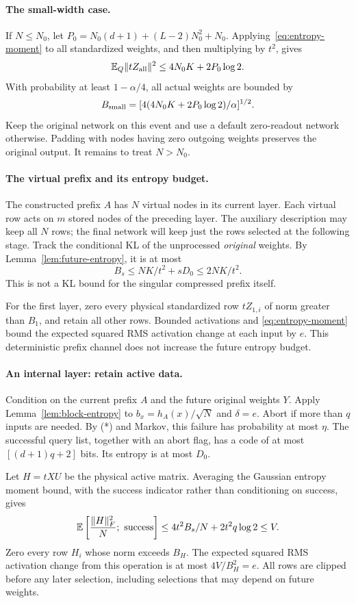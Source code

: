 \paragraph{The small-width case.}
If $N\le N_0$, let
$P_0=N_0(d+1)+(L-2)N_0^2+N_0$. Applying~\eqref{eq:entropy-moment} to all
standardized weights, and then multiplying by $t^2$, gives
\[
 \mathbb E_Q\|tZ_{\rm all}\|^2\le4N_0K+2P_0\log2.
\]
With probability at least $1-\alpha/4$, all actual weights are bounded by
\[
 B_{\rm small}=[4(4N_0K+2P_0\log2)/\alpha]^{1/2}.
\]
Keep the original network on this event and use a default zero-readout network otherwise.
Padding with nodes having zero outgoing weights preserves the original output.
It remains to treat $N>N_0$.

\paragraph{The virtual prefix and its entropy budget.}
The constructed prefix $A$ has $N$ virtual nodes in its current layer. Each
virtual row acts on $m$ stored nodes of the preceding layer. The auxiliary
description may keep all $N$ rows; the final network will keep just the rows
selected at the following stage. Track the conditional KL of the unprocessed
\emph{original} weights. By Lemma~\ref{lem:future-entropy}, it is at most
\[
 B_s\le NK/t^2+sD_0\le2NK/t^2.                              \tag{*}
\]
This is not a KL bound for the singular compressed prefix itself.

For the first layer, zero every physical standardized row $tZ_{1,i}$ of norm
greater than $B_1$, and retain all other rows. Bounded activations and
\eqref{eq:entropy-moment} bound the expected squared RMS activation change
at each input by $e$. This deterministic prefix channel does not increase the
future entropy budget.

\paragraph{An internal layer: retain active data.}
Condition on the current prefix $A$ and the future original weights $Y$.
Apply Lemma~\ref{lem:block-entropy} to
$b_x=h_A(x)/\sqrt N$ and $\delta=e$. Abort if more than $q$ inputs are needed.
By (*) and Markov, this failure has probability at most $\eta$.
The successful query list, together with an abort flag, has a code of at most
$[(d+1)q+2]$ bits. Its entropy is at most $D_0$.

Let $H=tXU$ be the physical active matrix. Averaging the Gaussian entropy
moment bound, with the success indicator rather than conditioning on success, gives
\[
 \E\left[\frac{\|H\|_F^2}{N};\ \text{success}\right]
 \le4t^2B_s/N+2t^2q\log2\le V.
\]
Zero every row $H_i$ whose norm exceeds $B_H$. The expected squared RMS
activation change from this operation is at most $4V/B_H^2=e$.
All rows are clipped before any later selection, including selections that
may depend on future weights.

